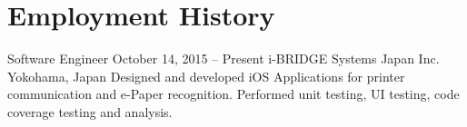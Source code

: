 \section*{Employment History}

\employment
	{Software Engineer}
	{October 14, 2015 -- Present}
	{i-BRIDGE Systems Japan Inc.}
	{Yokohama, Japan}
	{Designed and developed iOS Applications for printer communication and e-Paper recognition. Performed unit testing, UI testing, code coverage testing and analysis.}

